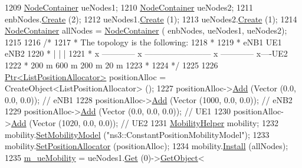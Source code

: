 \begin{DoxyCode}
1209   \hyperlink{classns3_1_1NodeContainer}{NodeContainer} ueNodes1;
1210   \hyperlink{classns3_1_1NodeContainer}{NodeContainer} ueNodes2;
1211   enbNodes.\hyperlink{classns3_1_1NodeContainer_a787f059e2813e8b951cc6914d11dfe69}{Create} (2);
1212   ueNodes1.\hyperlink{classns3_1_1NodeContainer_a787f059e2813e8b951cc6914d11dfe69}{Create} (1);
1213   ueNodes2.\hyperlink{classns3_1_1NodeContainer_a787f059e2813e8b951cc6914d11dfe69}{Create} (1);
1214   \hyperlink{classns3_1_1NodeContainer}{NodeContainer} allNodes = \hyperlink{classns3_1_1NodeContainer}{NodeContainer} ( enbNodes, ueNodes1, ueNodes2);
1215 
1216   \textcolor{comment}{/*}
1217 \textcolor{comment}{   * The topology is the following:}
1218 \textcolor{comment}{   *}
1219 \textcolor{comment}{   *  eNB1            UE1                                      eNB2}
1220 \textcolor{comment}{   *    |              |                                         |}
1221 \textcolor{comment}{   *    x ------------ x ------------------------ x ------------ x----UE2}
1222 \textcolor{comment}{   *         200 m               600 m                  200 m      20 m}
1223 \textcolor{comment}{   *}
1224 \textcolor{comment}{   */}
1225 
1226   \hyperlink{classns3_1_1Ptr}{Ptr<ListPositionAllocator>} positionAlloc = CreateObject<ListPositionAllocator> 
      ();
1227   positionAlloc->\hyperlink{classns3_1_1ListPositionAllocator_a460e82f015ac012a73ba0ea0cccb3486}{Add} (Vector (0.0, 0.0, 0.0));   \textcolor{comment}{// eNB1}
1228   positionAlloc->\hyperlink{classns3_1_1ListPositionAllocator_a460e82f015ac012a73ba0ea0cccb3486}{Add} (Vector (1000, 0.0, 0.0)); \textcolor{comment}{// eNB2}
1229   positionAlloc->\hyperlink{classns3_1_1ListPositionAllocator_a460e82f015ac012a73ba0ea0cccb3486}{Add} (Vector (0.0, 0.0, 0.0));  \textcolor{comment}{// UE1}
1230   positionAlloc->\hyperlink{classns3_1_1ListPositionAllocator_a460e82f015ac012a73ba0ea0cccb3486}{Add} (Vector (1020, 0.0, 0.0));  \textcolor{comment}{// UE2}
1231   \hyperlink{classns3_1_1MobilityHelper}{MobilityHelper} mobility;
1232   mobility.\hyperlink{classns3_1_1MobilityHelper_a030275011b6f40682e70534d30280aba}{SetMobilityModel} (\textcolor{stringliteral}{"ns3::ConstantPositionMobilityModel"});
1233   mobility.\hyperlink{classns3_1_1MobilityHelper_ac59d5295076be3cc11021566713a28c5}{SetPositionAllocator} (positionAlloc);
1234   mobility.\hyperlink{classns3_1_1MobilityHelper_a07737960ee95c0777109cf2994dd97ae}{Install} (allNodes);
1235   \hyperlink{classLteFrAreaTestCase_ae2f235fc4d87154ef9f32bc0d92ef2ca}{m\_ueMobility} = ueNodes1.\hyperlink{classns3_1_1NodeContainer_a9ed96e2ecc22e0f5a3d4842eb9bf90bf}{Get} (0)->\hyperlink{classns3_1_1Object_a13e18c00017096c8381eb651d5bd0783}{GetObject}<

\end{DoxyCode}
